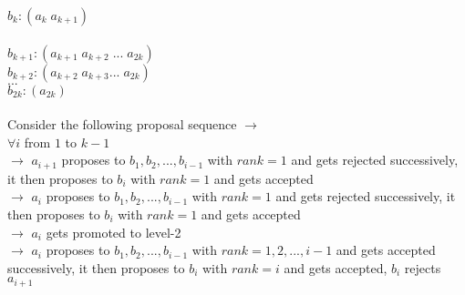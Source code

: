 \documentclass[a4paper,10pt]{article}
\theoremstyle{plain} %
\theoremstyle{plain} %
\begin{document}
$b_{k}: (a_{k} \; a_{k+1})$ 
\\ \\
$b_{k+1}: (a_{k+1} \; a_{k+2} \; ... \; a_{2k})$ \\
$b_{k+2}: (a_{k+2} \; a_{k+3} ... \; a_{2k})$ \\
$...$ \\
$b_{2k}: (a_{2k})$ 
\\ \\
Consider the following proposal sequence $\rightarrow$
\\ $\forall i$ from $1$ to $k-1$
\\ $\rightarrow$ $a_{i+1}$ proposes to $b_{1}, b_{2}, ..., b_{i-1}$ with $rank = 1$ and gets rejected successively, it then proposes to $b_{i}$ with $rank = 1$ and gets accepted
\\ $\rightarrow$ $a_{i}$ proposes to $b_{1}, b_{2}, ..., b_{i-1}$ with $rank = 1$ and gets rejected successively, it then proposes to $b_{i}$ with $rank = 1$ and gets accepted
\\ $\rightarrow$ $a_{i}$ gets promoted to level-2
\\ $\rightarrow$ $a_{i}$ proposes to $b_{1}, b_{2}, ..., b_{i-1}$ with $rank = 1, 2, ..., i-1$ and gets accepted successively, it then proposes to $b_{i}$ with $rank = i$ and gets accepted, $b_i$ rejects $a_{i+1}$
\end{document}
